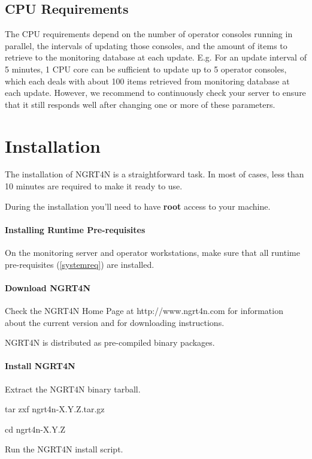 \documentclass[a4paper,9pt]{article}
\begin{document}
\subsection{CPU Requirements}
The CPU requirements depend on the number of operator consoles running in parallel, the intervals of updating those consoles, and the amount of items to retrieve to the monitoring database at each update. E.g. For an update interval of 5 minutes, 1 CPU core can be sufficient to update up to 5 operator consoles, which each deals with about 100 items retrieved from monitoring database at each update. However, we recommend to continuously check your server to ensure that it still responds well after changing one or more of these parameters.

\section{Installation}
The installation of NGRT4N is a straightforward task. In most of cases, less than 10 minutes are required to make it ready to use.

During the installation you'll need to have {\bf root} access to your machine.

\paragraph{Installing Runtime Pre-requisites}

On the monitoring server and operator workstations, make sure that all runtime pre-requisites (\ref{systemreq}) are installed.

\paragraph{Download NGRT4N}

Check the NGRT4N Home Page at http://www.ngrt4n.com for information about the current version and for downloading instructions.

NGRT4N is distributed as pre-compiled binary packages. 

\paragraph{Install NGRT4N}

Extract the NGRT4N binary tarball.

tar zxf ngrt4n-X.Y.Z.tar.gz

cd  ngrt4n-X.Y.Z

Run the NGRT4N install script. 
\end{document}
